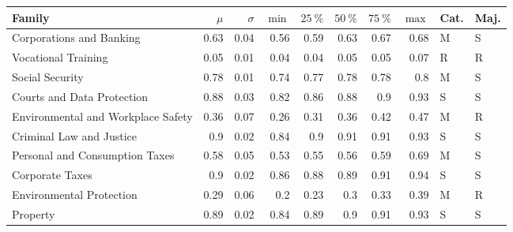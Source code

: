 \begin{tabular}{lrrrrrrrll}
\toprule
 Family                             &   $\mu$ &   $\sigma$ &   $\min$ &   $25~\%$ &   $50~\%$ &   $75~\%$ &   $\max$ & Cat.   & Maj.   \\
\midrule
 Corporations and Banking           &    0.63 &       0.04 &     0.56 &      0.59 &      0.63 &      0.67 &     0.68 & M      & S      \\
 Vocational Training                &    0.05 &       0.01 &     0.04 &      0.04 &      0.05 &      0.05 &     0.07 & R      & R      \\
 Social Security                    &    0.78 &       0.01 &     0.74 &      0.77 &      0.78 &      0.78 &     0.8  & M      & S      \\
 Courts and Data Protection         &    0.88 &       0.03 &     0.82 &      0.86 &      0.88 &      0.9  &     0.93 & S      & S      \\
 Environmental and Workplace Safety &    0.36 &       0.07 &     0.26 &      0.31 &      0.36 &      0.42 &     0.47 & M      & R      \\
 Criminal Law and Justice           &    0.9  &       0.02 &     0.84 &      0.9  &      0.91 &      0.91 &     0.93 & S      & S      \\
 Personal and Consumption Taxes     &    0.58 &       0.05 &     0.53 &      0.55 &      0.56 &      0.59 &     0.69 & M      & S      \\
 Corporate Taxes                    &    0.9  &       0.02 &     0.86 &      0.88 &      0.89 &      0.91 &     0.94 & S      & S      \\
 Environmental Protection           &    0.29 &       0.06 &     0.2  &      0.23 &      0.3  &      0.33 &     0.39 & M      & R      \\
 Property                           &    0.89 &       0.02 &     0.84 &      0.89 &      0.9  &      0.91 &     0.93 & S      & S      \\
\bottomrule
\end{tabular}